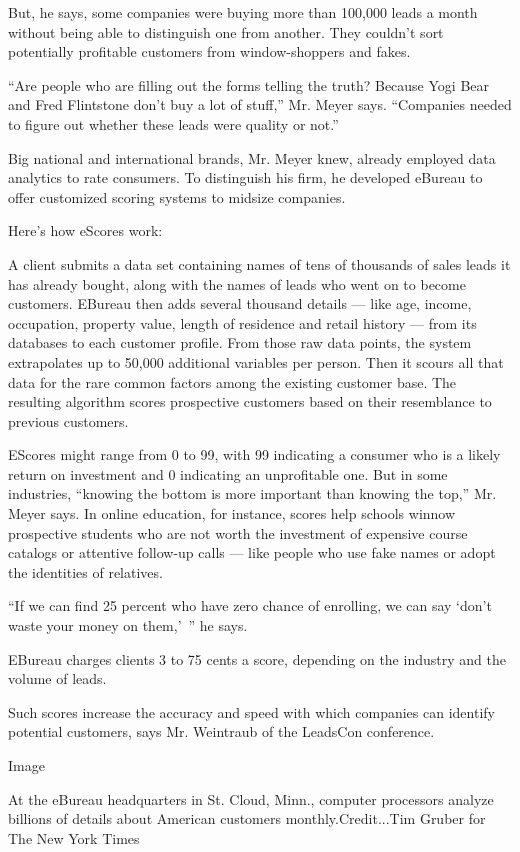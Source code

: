 But, he says, some companies were buying more than 100,000 leads a month
without being able to distinguish one from another. They couldn't sort
potentially profitable customers from window-shoppers and fakes.

``Are people who are filling out the forms telling the truth? Because
Yogi Bear and Fred Flintstone don't buy a lot of stuff,'' Mr. Meyer
says. ``Companies needed to figure out whether these leads were quality
or not.''

Big national and international brands, Mr. Meyer knew, already employed
data analytics to rate consumers. To distinguish his firm, he developed
eBureau to offer customized scoring systems to midsize companies.

Here's how eScores work:

A client submits a data set containing names of tens of thousands of
sales leads it has already bought, along with the names of leads who
went on to become customers. EBureau then adds several thousand details
--- like age, income, occupation, property value, length of residence
and retail history --- from its databases to each customer profile. From
those raw data points, the system extrapolates up to 50,000 additional
variables per person. Then it scours all that data for the rare common
factors among the existing customer base. The resulting algorithm scores
prospective customers based on their resemblance to previous customers.

EScores might range from 0 to 99, with 99 indicating a consumer who is a
likely return on investment and 0 indicating an unprofitable one. But in
some industries, ``knowing the bottom is more important than knowing the
top,'' Mr. Meyer says. In online education, for instance, scores help
schools winnow prospective students who are not worth the investment of
expensive course catalogs or attentive follow-up calls --- like people
who use fake names or adopt the identities of relatives.

``If we can find 25 percent who have zero chance of enrolling, we can
say `don't waste your money on them,'~'' he says.

EBureau charges clients 3 to 75 cents a score, depending on the industry
and the volume of leads.

Such scores increase the accuracy and speed with which companies can
identify potential customers, says Mr. Weintraub of the LeadsCon
conference.

Image

At the eBureau headquarters in St. Cloud, Minn., computer processors
analyze billions of details about American customers
monthly.Credit...Tim Gruber for The New York Times

